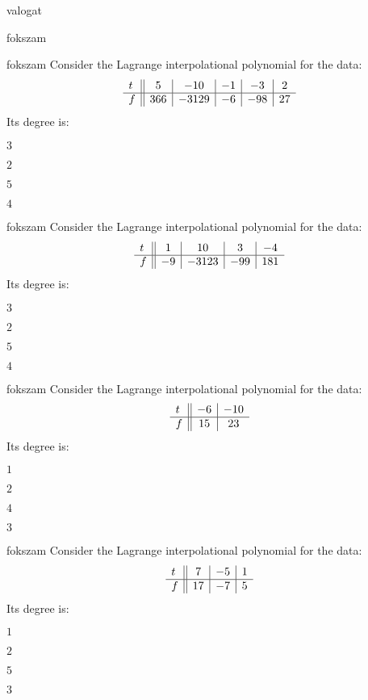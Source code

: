 \documentclass[12pt]{article}
\begin{document}
\begin{quiz}{valogat}
\begin{multi}{fokszam}
\end{multi}
\begin{multi}{fokszam}
Consider the Lagrange interpolational polynomial for the data:
$$\begin{array}{l ||c|c|c|c|c}t&5&-10&-1&-3&2\\ \hline f&366&-3129&-6&-98&27 \\ \end{array}$$
Its degree is:
\item* $ 3 $
\item  $ 2 $
\item  $ 5 $
\item  $ 4 $
\end{multi}
\begin{multi}{fokszam}
Consider the Lagrange interpolational polynomial for the data:
$$\begin{array}{l ||c|c|c|c}t&1&10&3&-4\\ \hline f&-9&-3123&-99&181 \\ \end{array}$$
Its degree is:
\item* $ 3 $
\item  $ 2 $
\item  $ 5 $
\item  $ 4 $
\end{multi}
\begin{multi}{fokszam}
Consider the Lagrange interpolational polynomial for the data:
$$\begin{array}{l ||c|c}t&-6&-10\\ \hline f&15&23 \\ \end{array}$$
Its degree is:
\item* $ 1 $
\item  $ 2 $
\item  $ 4 $
\item  $ 3 $
\end{multi}
\begin{multi}{fokszam}
Consider the Lagrange interpolational polynomial for the data:
$$\begin{array}{l ||c|c|c}t&7&-5&1\\ \hline f&17&-7&5 \\ \end{array}$$
Its degree is:
\item* $ 1 $
\item  $ 2 $
\item  $ 5 $
\item  $ 3 $
\end{multi}

\end{quiz}
\end{document}
